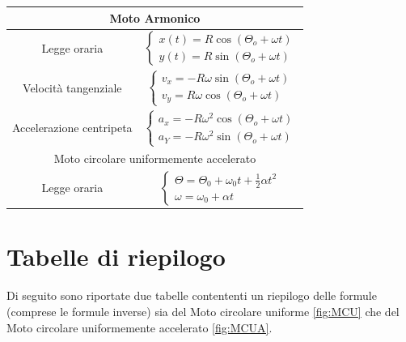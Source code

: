 \begin{tabular}{|c|c|}
\hline

    \multicolumn{2}{|c|}{Moto Armonico} \\

        \hline Legge oraria &
            $
                \begin{cases}
                    x(t)=R\cos{(\Theta_o+\omega t)} \\
                    y(t)=R\sin{(\Theta_o+\omega t)}
                \end{cases}
            $
            \\

        \hline Velocità tangenziale &
            $
                \begin{cases}
                    v_x=-R\omega\sin{(\Theta_o+\omega t)} \\
                    v_y=R\omega\cos{(\Theta_o+\omega t)}
                \end{cases}
            $
            \\

        \hline Accelerazione centripeta &
            $
                \begin{cases}
                    a_x=-R\omega^2\cos{(\Theta_o+\omega t)} \\
                    a_Y=-R\omega^2\sin{(\Theta_o+\omega t)}
                \end{cases}
            $
            \\
    \hline

    \multicolumn{2}{|c|}{Moto circolare uniformemente accelerato} \\

        \hline Legge oraria &
            $
                \begin{cases} 
                    \Theta = \Theta_0 + \omega_0t + \frac{1}{2}\alpha t^2 \\ 
                    \omega = \omega_0+\alpha t
                \end{cases}
            $
            \\
    \hline
\end{tabular}
\endgroup

    \section*{Tabelle di riepilogo} Di seguito sono riportate due 
    tabelle contententi un riepilogo delle formule (comprese le formule 
    inverse) sia del Moto circolare uniforme \ref{fig:MCU} che del Moto 
    circolare uniformemente accelerato \ref{fig:MCUA}.

